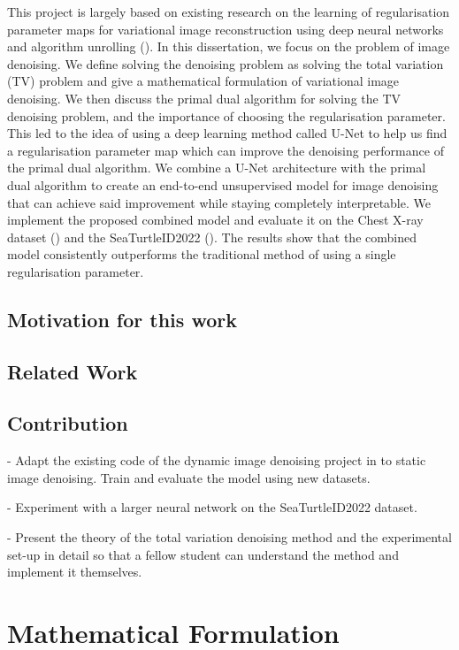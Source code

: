 \documentclass[12pt]{article}
\begin{document}
This project is largely based on existing research 
on the learning of 
regularisation parameter maps for variational image reconstruction using deep neural networks and algorithm unrolling (\cite{kofler2023learning}).
In this dissertation, we 
focus on the problem of image denoising.
We define solving the denoising problem as solving the total variation (TV) problem and give a mathematical formulation of variational image denoising. 
We then discuss the primal dual algorithm for solving the TV denoising problem, and the importance of choosing the regularisation parameter.
This led to the idea of using a deep learning method called U-Net to help us find a regularisation parameter map which can improve the denoising performance of the primal dual algorithm.
We combine a U-Net architecture with the primal dual algorithm to create an end-to-end unsupervised model for image denoising that can achieve said improvement while staying completely interpretable. 
We implement the proposed combined model and evaluate it on the Chest X-ray dataset (\cite{kermany2018large}) and the SeaTurtleID2022 (\cite{Adam_2024_WACV}).
The results show that the combined model consistently outperforms the traditional method of using a single regularisation parameter.

\subsection{Motivation for this work}


\subsection{Related Work}


\subsection{Contribution}

- Adapt the existing code of the dynamic image denoising project in \cite{kofler2023learning} to static image denoising. Train and evaluate the model using new datasets.

- Experiment with a larger neural network on the SeaTurtleID2022 dataset.

- Present the theory of the total variation denoising method and the experimental set-up in detail so that a fellow student can understand the method and implement it themselves.


\section{Mathematical Formulation}
\end{document}
